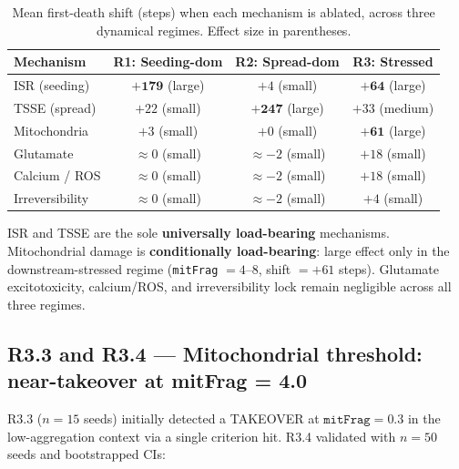 \documentclass[12pt,a4paper]{article}
\begin{document}
\begin{table}[H]
\centering
\caption{Mean first-death shift (steps) when each mechanism is ablated, across three dynamical regimes. Effect size in parentheses.}
\label{tab:r32_ablation}
\small
\begin{tabular}{lccc}
\toprule
\textbf{Mechanism} & \textbf{R1: Seeding-dom} & \textbf{R2: Spread-dom} & \textbf{R3: Stressed} \\
\midrule
ISR (seeding)       & $\mathbf{+179}$ (large)  & $+4$ (small)            & $\mathbf{+64}$ (large)  \\
TSSE (spread)       & $+22$ (small)            & $\mathbf{+247}$ (large) & $+33$ (medium)          \\
Mitochondria        & $+3$ (small)             & $+0$ (small)            & $\mathbf{+61}$ (large)  \\
Glutamate           & $\approx 0$ (small)      & $\approx -2$ (small)    & $+18$ (small)           \\
Calcium / ROS       & $\approx 0$ (small)      & $\approx -2$ (small)    & $+18$ (small)           \\
Irreversibility     & $\approx 0$ (small)      & $\approx -2$ (small)    & $+4$ (small)            \\
\bottomrule
\end{tabular}
\end{table}

ISR and TSSE are the sole \textbf{universally load-bearing} mechanisms. Mitochondrial damage
is \textbf{conditionally load-bearing}: large effect only in the downstream-stressed regime
(\texttt{mitFrag} $= 4$--$8$, shift $= +61$ steps). Glutamate excitotoxicity, calcium/ROS,
and irreversibility lock remain negligible across all three regimes.

\subsection{R3.3 and R3.4 --- Mitochondrial threshold: near-takeover at mitFrag = 4.0}

R3.3 ($n=15$ seeds) initially detected a TAKEOVER at $\texttt{mitFrag}=0.3$ in the
low-aggregation context via a single criterion hit. R3.4 validated with $n = 50$ seeds and
bootstrapped CIs:
\end{document}
